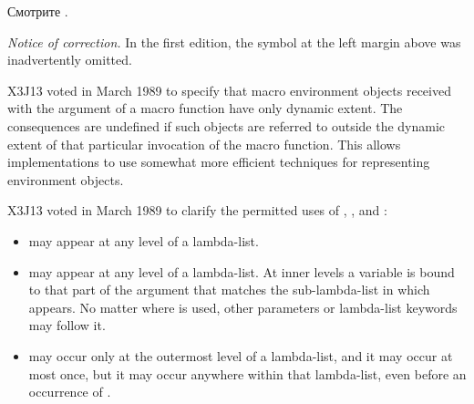 \begin{defmac}
Смотрите .

\begin{new}%
\emph{Notice of correction.}
In the first edition, the symbol  at the
left margin above was inadvertently omitted.
\end{new}

\begin{newer}
X3J13 voted in March 1989 
to specify that macro environment objects received with the 
argument of a macro function
have only dynamic extent.  The consequences are undefined if such objects are
referred to outside the dynamic extent of that particular
invocation of the macro function.
This allows implementations to use somewhat more efficient techniques
for representing environment objects. 
\end{newer}

\begin{newer}
X3J13 voted in March 1989  to clarify the permitted
uses of , , and :
\begin{itemize}
\item {} may appear at any level of a  lambda-list.
\item {} may appear at any level of a  lambda-list.
At inner levels a  variable is bound to that part of the argument
that matches the sub-lambda-list in which  appears.  No matter where
 is used, other parameters or lambda-list keywords may follow it.
\item {} may occur only at the outermost level of a 
lambda-list, and it may occur at most once, but it may occur anywhere within
that lambda-list, even before an occurrence of .
\end{itemize}
\end{newer}


\end{defmac}
